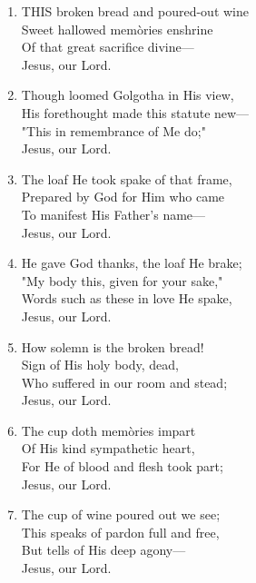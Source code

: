 \begin{enumerate}
    \item THIS broken bread and poured-out wine \\
        Sweet hallowed mem\`ories enshrine \\
        Of that great sacrifice divine--- \\
        Jesus, our Lord.

    \item Though loomed Golgotha in His view, \\
        His forethought made this statute new--- \\
        "This in remembrance of Me do;" \\
        Jesus, our Lord.

    \item The loaf He took spake of that frame, \\
        Prepared by God for Him who came \\
        To manifest His Father's name--- \\
        Jesus, our Lord.

    \item He gave God thanks, the loaf He brake; \\
        "My body this, given for your sake," \\
        Words such as these in love He spake, \\
        Jesus, our Lord.

    \item How solemn is the broken bread! \\
        Sign of His holy body, dead, \\
        Who suffered in our room and stead; \\
        Jesus, our Lord.

    \item The cup doth mem\`ories impart \\
        Of His kind sympathetic heart, \\
        For He of blood and flesh took part; \\
        Jesus, our Lord.

    \item The cup of wine poured out we see; \\
        This speaks of pardon full and free, \\
        But tells of His deep agony--- \\
        Jesus, our Lord.


\end{enumerate}
